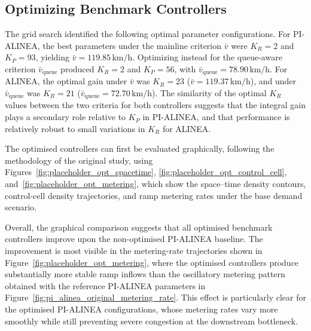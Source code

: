 \subsection{Optimizing Benchmark Controllers}

The grid search identified the following optimal parameter configurations.
For PI-ALINEA, the best parameters under the mainline criterion
$\bar{v}$ were $K_R = 2$ and $K_P = 93$, yielding
$\bar{v} = 119.85\,\mathrm{km/h}$. Optimizing instead for the
queue-aware criterion $\bar{v}_\text{queue}$ produced $K_R = 2$ and
$K_P = 56$, with $\bar{v}_\text{queue} = 78.90\,\mathrm{km/h}$. For
ALINEA, the optimal gain under $\bar{v}$ was $K_R = 23$
($\bar{v} = 119.37\,\mathrm{km/h}$), and under $\bar{v}_\text{queue}$
was $K_R = 21$ ($\bar{v}_\text{queue} = 72.70\,\mathrm{km/h}$). The
similarity of the optimal $K_R$ values between the two criteria for
both controllers suggests that the integral gain plays a secondary role
relative to $K_P$ in PI-ALINEA, and that performance is relatively
robust to small variations in $K_R$ for ALINEA.

The optimised controllers can first be evaluated graphically, following the
methodology of the original study, using
Figures~\ref{fig:placeholder_opt_spacetime},
\ref{fig:placeholder_opt_control_cell}, and~\ref{fig:placeholder_opt_metering},
which show the space--time density contours, control-cell density trajectories,
and ramp metering rates under the base demand scenario.

Overall, the graphical comparison suggests that all optimised benchmark
controllers improve upon the non-optimised PI-ALINEA baseline. The improvement
is most visible in the metering-rate trajectories shown in
Figure~\ref{fig:placeholder_opt_metering}, where the optimised controllers
produce substantially more stable ramp inflows than the oscillatory metering
pattern obtained with the reference PI-ALINEA parameters in
Figure~\ref{fig:pi_alinea_original_metering_rate}. This effect is particularly
clear for the optimised PI-ALINEA configurations, whose metering rates vary more
smoothly while still preventing severe congestion at the downstream bottleneck.


